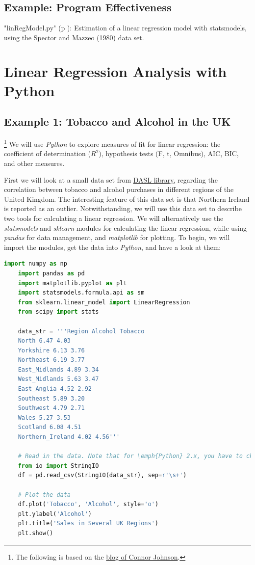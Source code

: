 \subsection{Example: Program Effectiveness}



\PyImg "linRegModel.py" (p \pageref{py:linRegModel}): Estimation of a linear regression model with statsmodels, using the Spector and Mazzeo (1980) data set.

\section{Linear Regression Analysis with Python}

\subsection{Example 1: Tobacco and Alcohol in the UK}

\footnote{The following is based on the \href{http://connor-johnson.com/2014/02/18/linear-regression-with-python/}{blog of Connor Johnson}.}
We will use \emph{Python} to explore measures of fit for linear regression: the coefficient of determination ($R^2$), hypothesis tests (F, t, Omnibus), AIC, BIC, and other measures.

First we will look at a small data set from \href{http://lib.stat.cmu.edu/DASL/Stories/AlcoholandTobacco.html}{DASL library}, regarding the correlation between tobacco and alcohol purchases in different regions of the United Kingdom. The interesting feature of this data set is that Northern Ireland is reported as an outlier. Notwithstanding, we will use this data set to describe two tools for calculating a linear regression. We will alternatively use the \emph{statsmodels} and \emph{sklearn} modules for calculating the linear regression, while using \emph{pandas} for data management, and \emph{matplotlib} for plotting. To begin, we will import the modules, get the data into \emph{Python}, and have a look at them:

\begin{lstlisting}[language=Python]
    import numpy as np
    import pandas as pd
    import matplotlib.pyplot as plt
    import statsmodels.formula.api as sm
    from sklearn.linear_model import LinearRegression
    from scipy import stats

    data_str = '''Region Alcohol Tobacco
    North 6.47 4.03
    Yorkshire 6.13 3.76
    Northeast 6.19 3.77
    East_Midlands 4.89 3.34
    West_Midlands 5.63 3.47
    East_Anglia 4.52 2.92
    Southeast 5.89 3.20
    Southwest 4.79 2.71
    Wales 5.27 3.53
    Scotland 6.08 4.51
    Northern_Ireland 4.02 4.56'''

    # Read in the data. Note that for \emph{Python} 2.x, you have to change the "import" statement
    from io import StringIO
    df = pd.read_csv(StringIO(data_str), sep=r'\s+')

    # Plot the data
    df.plot('Tobacco', 'Alcohol', style='o')
    plt.ylabel('Alcohol')
    plt.title('Sales in Several UK Regions')
    plt.show()
\end{lstlisting}

